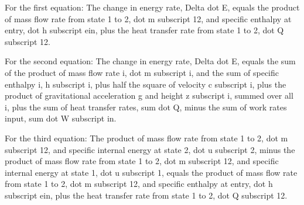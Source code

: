 For the first equation:
The change in energy rate, Delta dot E, equals the product of mass flow rate from state 1 to 2, dot m subscript 12, and specific enthalpy at entry, dot h subscript ein, plus the heat transfer rate from state 1 to 2, dot Q subscript 12.

For the second equation:
The change in energy rate, Delta dot E, equals the sum of the product of mass flow rate i, dot m subscript i, and the sum of specific enthalpy i, h subscript i, plus half the square of velocity c subscript i, plus the product of gravitational acceleration g and height z subscript i, summed over all i, plus the sum of heat transfer rates, sum dot Q, minus the sum of work rates input, sum dot W subscript in.

For the third equation:
The product of mass flow rate from state 1 to 2, dot m subscript 12, and specific internal energy at state 2, dot u subscript 2, minus the product of mass flow rate from state 1 to 2, dot m subscript 12, and specific internal energy at state 1, dot u subscript 1, equals the product of mass flow rate from state 1 to 2, dot m subscript 12, and specific enthalpy at entry, dot h subscript ein, plus the heat transfer rate from state 1 to 2, dot Q subscript 12.